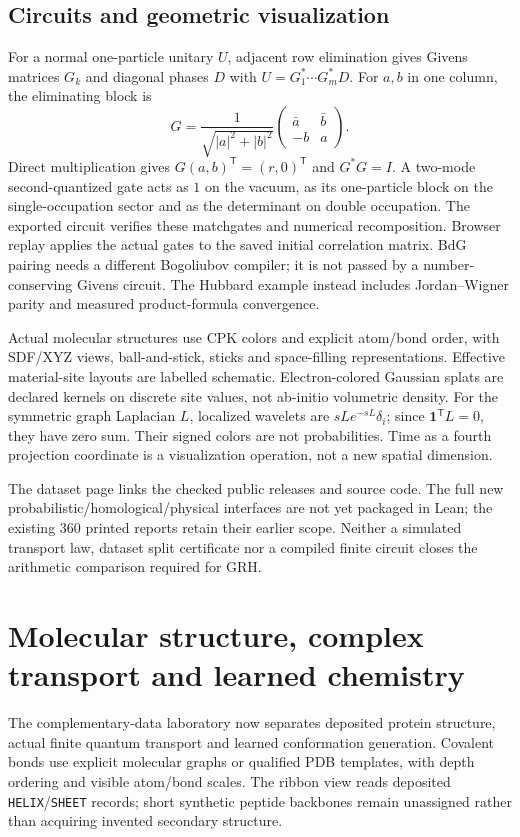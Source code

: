 \documentclass[11pt]{article}
\theoremstyle{definition}\newtheorem{definition}[theorem]{Definition}
\theoremstyle{remark}\newtheorem{remark}[theorem]{Remark}
\begin{document}
\subsection{Circuits and geometric visualization}
For a normal one-particle unitary $U$, adjacent row elimination gives Givens
matrices $G_k$ and diagonal phases $D$ with
$U=G_1^*\cdots G_m^*D$. For $a,b$ in one column, the eliminating block is
\[
 G=\frac1{\sqrt{|a|^2+|b|^2}}
 \begin{pmatrix}\bar a&\bar b\\-b&a\end{pmatrix}.
\]
Direct multiplication gives $G(a,b)^{\mathsf T}=(r,0)^{\mathsf T}$ and
$G^*G=I$. A two-mode second-quantized gate acts as $1$ on the vacuum, as its
one-particle block on the single-occupation sector and as the determinant on
double occupation. The exported circuit verifies these matchgates and numerical
recomposition. Browser replay applies the actual gates to the saved initial
correlation matrix. BdG pairing needs a different Bogoliubov compiler; it is
not passed by a number-conserving Givens circuit. The Hubbard example instead
includes Jordan--Wigner parity and measured product-formula convergence.

Actual molecular structures use CPK colors and explicit atom/bond order, with
SDF/XYZ views, ball-and-stick, sticks and space-filling representations.
Effective material-site layouts are labelled schematic. Electron-colored
Gaussian splats are declared kernels on discrete site values, not ab-initio
volumetric density. For the symmetric graph Laplacian $L$, localized wavelets
are $sLe^{-sL}\delta_i$; since $\mathbf1^{\mathsf T}L=0$, they have zero sum.
Their signed colors are not probabilities. Time as a fourth projection
coordinate is a visualization operation, not a new spatial dimension.

The dataset page links the checked public releases and source code. The full
new probabilistic/homological/physical interfaces are not yet packaged in Lean;
the existing $360$ printed reports retain their earlier scope. Neither a simulated
transport law, dataset split certificate nor a compiled finite circuit closes
the arithmetic comparison required for GRH.

\section{Molecular structure, complex transport and learned chemistry}
The complementary-data laboratory now separates deposited protein structure,
actual finite quantum transport and learned conformation generation. Covalent
bonds use explicit molecular graphs or qualified PDB templates, with depth
ordering and visible atom/bond scales. The ribbon view reads deposited
\texttt{HELIX}/\texttt{SHEET} records; short synthetic peptide backbones remain
unassigned rather than acquiring invented secondary structure.
\end{document}
